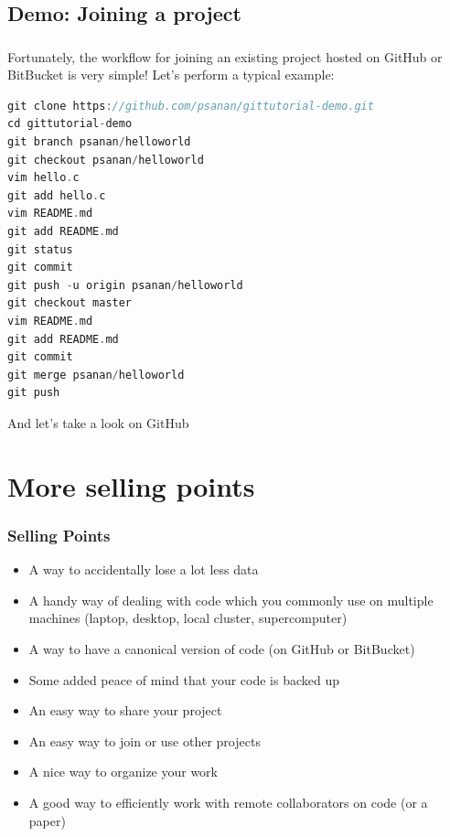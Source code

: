 \documentclass{beamer}
\begin{document}
\subsection{Demo: Joining a project}

\begin{frame}[fragile]
\frametitle{}
Fortunately, the workflow for joining an existing project hosted on GitHub or BitBucket is very simple!
Let's perform a typical example:
\begin{lstlisting}[language=C++]
git clone https://github.com/psanan/gittutorial-demo.git
cd gittutorial-demo
git branch psanan/helloworld
git checkout psanan/helloworld
vim hello.c
git add hello.c
vim README.md
git add README.md
git status
git commit
git push -u origin psanan/helloworld
git checkout master
vim README.md
git add README.md
git commit
git merge psanan/helloworld
git push
\end{lstlisting}
And let's take a look on GitHub
\end{frame}

\section{More selling points}
\begin{frame}[fragile]
\frametitle{Selling Points}
\begin{itemize}
\item A way to accidentally lose a lot less data
\item A handy way of dealing with code which you commonly use on multiple machines (laptop, desktop, local cluster, supercomputer)
\item A way to have a canonical version of code (on GitHub or BitBucket)
\item Some added peace of mind that your code is backed up
\item An easy way to share your project
\item An easy way to join or use other projects
\item A nice way to organize your work
\item A good way to efficiently work with remote collaborators on code (or a paper)
\end{itemize}
\end{frame}
\end{document}
